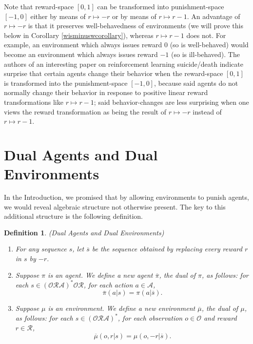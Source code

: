 \documentclass{article}
\newtheorem{definition}[theorem]{Definition}
\begin{document}
Note that reward-space $[0,1]$ can be transformed into punishment-space
$[-1,0]$ either by means of $r\mapsto -r$ or by means of $r\mapsto r-1$.
An advantage of $r\mapsto -r$ is that it preserves well-behavedness of
environments (we will prove this below in Corollary \ref{wisminuswcorollary}),
whereas $r\mapsto r-1$ does not. For example, an environment which always
issues reward $0$ (so is well-behaved)
would become an environment which always issues reward $-1$ (so is ill-behaved).
The authors of an interesting paper on reinforcement learning suicide/death
\cite{martin2016death} indicate surprise that certain agents change their behavior
when the reward-space $[0,1]$ is transformed into the punishment-space $[-1,0]$,
because said agents do not normally change their behavior in response to positive
linear reward transformations like $r\mapsto r-1$; said behavior-changes are
less surprising when one views the reward transformation as being the result of
$r\mapsto -r$ instead of $r\mapsto r-1$.

\section{Dual Agents and Dual Environments}
\label{dualsection}

In the Introduction, we promised that by allowing environments to punish agents,
we would reveal algebraic structure not otherwise present. The key to this additional
structure is the following definition.

\begin{definition}
(Dual Agents and Dual Environments)
\begin{enumerate}
    \item
    For any sequence $s$, let $\overline s$ be the sequence obtained
    by replacing every reward $r$ in $s$ by $-r$.
    \item
    Suppose $\pi$ is an agent.
    We define a new agent $\overline \pi$, the \emph{dual} of $\pi$,
    as follows:
    for each $s\in (\mathcal O\mathcal R\mathcal A)^*\mathcal O\mathcal R$,
    for each action $a\in\mathcal A$,
    \[\overline\pi(a|s)=\pi(a|\overline s).\]
    \item
    Suppose $\mu$ is an environment.
    We define a new environment $\overline\mu$, the \emph{dual} of $\mu$,
    as follows:
    for each $s\in (\mathcal O\mathcal R\mathcal A)^*$,
    for each observation $o\in\mathcal O$
    and reward $r\in\mathcal R$,
    \[\overline\mu(o,r|s)=\mu(o,-r|\overline s).\]
\end{enumerate}
\end{definition}
\end{document}
